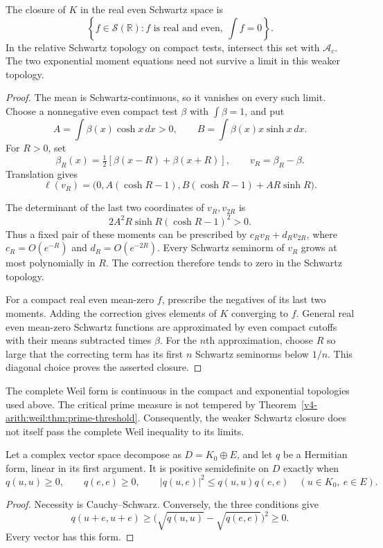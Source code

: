 \begin{theorem}
\label{v4-arith:weil:thm:moment-closure}
The closure of \(K\) in the real even Schwartz space is
\[
 \left\{f\in\mathcal S(\mathbb R):f\text{ is real and even},\
                                    \int f=0\right\}.
\]
In the relative Schwartz topology on compact tests, intersect this set
with \(\mathscr A_c\). The two exponential moment equations need not
survive a limit in this weaker topology.
\end{theorem}
\begin{proof}
The mean is Schwartz-continuous, so it vanishes on every such limit.
Choose a nonnegative even compact test \(\beta\) with \(\int\beta=1\),
and put
\[
 A=\int\beta(x)\cosh x\,dx>0,\qquad
 B=\int\beta(x)x\sinh x\,dx.
\]
For \(R>0\), set
\[
 \beta_R(x)=\tfrac12[\beta(x-R)+\beta(x+R)],\qquad
 v_R=\beta_R-\beta.
\]
Translation gives
\[
 \ell(v_R)=\bigl(0,A(\cosh R-1),
              B(\cosh R-1)+AR\sinh R\bigr).
\]

The determinant of the last two coordinates of \(v_R,v_{2R}\) is
\[
 2A^2R\sinh R(\cosh R-1)^2>0.
\]
Thus a fixed pair of these moments can be prescribed by
\(c_Rv_R+d_Rv_{2R}\), where
\(c_R=O(e^{-R})\) and \(d_R=O(e^{-2R})\).
Every Schwartz seminorm of \(v_R\) grows at most polynomially in \(R\).
The correction therefore tends to zero in the Schwartz topology.

For a compact real even mean-zero \(f\), prescribe the negatives of its
last two moments. Adding the correction gives elements of \(K\)
converging to \(f\). General real even mean-zero Schwartz functions are
approximated by even compact cutoffs with their means subtracted times
\(\beta\). For the \(n\)th approximation, choose \(R\) so large that
the correcting term has its first \(n\) Schwartz seminorms below \(1/n\).
This diagonal choice proves the asserted closure.
\end{proof}

The complete Weil form is continuous in the compact and exponential
topologies used above. The critical prime measure is not tempered by
Theorem~\ref{v4-arith:weil:thm:prime-threshold}. Consequently, the weaker
Schwartz closure does not itself pass the complete Weil inequality to
its limits.

\begin{proposition}
\label{v4-arith:weil:prop:cross}
Let a complex vector space decompose as \(D=K_0\oplus E\), and let
\(q\) be a Hermitian form, linear in its first argument. It is positive
semidefinite on \(D\) exactly when
\[
 q(u,u)\ge0,\qquad q(e,e)\ge0,\qquad
 |q(u,e)|^2\le q(u,u)q(e,e)
 \quad(u\in K_0,\ e\in E).
\]
\end{proposition}
\begin{proof}
Necessity is Cauchy--Schwarz. Conversely, the three conditions give
\[
 q(u+e,u+e)\ge
       \bigl(\sqrt{q(u,u)}-\sqrt{q(e,e)}\bigr)^2\ge0.
\]
Every vector has this form.
\end{proof}

